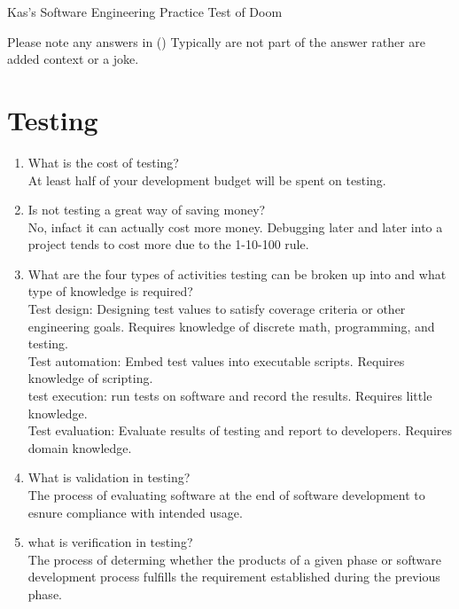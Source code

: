 \documentclass[10pt]{article}
\begin{document}
\begin{center}
    \huge
    Kas's Software Engineering Practice Test of Doom\\

\end{center}
\normalsize
Please note any answers in () Typically are not part of the answer rather are added context or a joke.\\

\section{Testing}

\begin{enumerate}
    \item What is the cost of testing?\\
          At least half of your development budget will be spent on testing.\\

    \item Is not testing a great way of saving money?\\
          No, infact it can actually cost more money. Debugging later and later into a project tends to cost more due to the 1-10-100 rule.\\

    \item What are the four types of activities testing can be broken up into and what type of knowledge is required?\\
          Test design: Designing test values to satisfy coverage criteria or other engineering goals. Requires knowledge of discrete math, programming, and testing.\\
          Test automation: Embed test values into executable scripts. Requires knowledge of scripting.\\
          test execution: run tests on software and record the results. Requires little knowledge.\\
          Test evaluation: Evaluate results of testing and report to developers. Requires domain knowledge.\\

    \item What is validation in testing?\\
          The process of evaluating software at the end of software development to esnure compliance with intended usage.\\

    \item what is verification in testing?\\
          The process of determing whether the products of a given phase or software development process fulfills the requirement established during the previous phase.\\


\end{enumerate}
\end{document}
